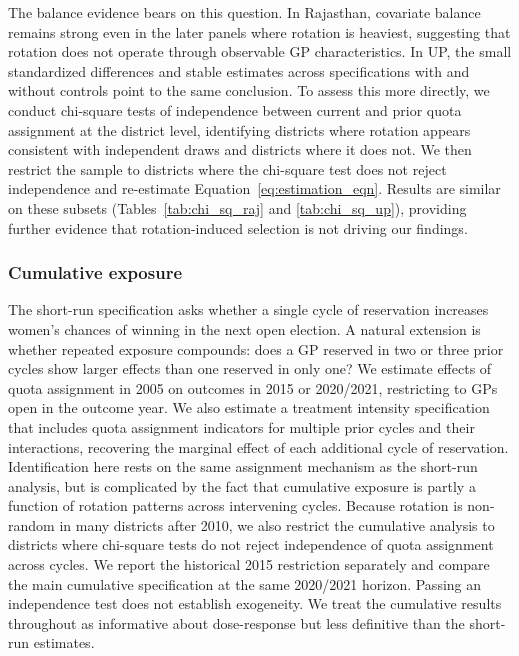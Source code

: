 \documentclass[12pt]{article}
\begin{document}
The balance evidence bears on this question. In Rajasthan, covariate balance remains strong even in the later panels where rotation is heaviest, suggesting that rotation does not operate through observable GP characteristics. In UP, the small standardized differences and stable estimates across specifications with and without controls point to the same conclusion. To assess this more directly, we conduct chi-square tests of independence between current and prior quota assignment at the district level, identifying districts where rotation appears consistent with independent draws and districts where it does not. We then restrict the sample to districts where the chi-square test does not reject independence and re-estimate Equation~\ref{eq:estimation_eqn}. Results are similar on these subsets (Tables~\ref{tab:chi_sq_raj} and \ref{tab:chi_sq_up}), providing further evidence that rotation-induced selection is not driving our findings.

\subsubsection*{Cumulative exposure}

The short-run specification asks whether a single cycle of reservation increases women's chances of winning in the next open election. A natural extension is whether repeated exposure compounds: does a GP reserved in two or three prior cycles show larger effects than one reserved in only one? We estimate effects of quota assignment in 2005 on outcomes in 2015 or 2020/2021, restricting to GPs open in the outcome year. We also estimate a treatment intensity specification that includes quota assignment indicators for multiple prior cycles and their interactions, recovering the marginal effect of each additional cycle of reservation. Identification here rests on the same assignment mechanism as the short-run analysis, but is complicated by the fact that cumulative exposure is partly a function of rotation patterns across intervening cycles. Because rotation is non-random in many districts after 2010, we also restrict the cumulative analysis to districts where chi-square tests do not reject independence of quota assignment across cycles. We report the historical 2015 restriction separately and compare the main cumulative specification at the same 2020/2021 horizon. Passing an independence test does not establish exogeneity. We treat the cumulative results throughout as informative about dose-response but less definitive than the short-run estimates.
\end{document}
